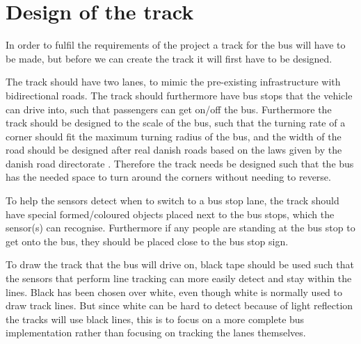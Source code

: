 \section{Design of the track} 

In order to fulfil the requirements of the project a track for the bus will have to be made, but before we can create the track it will first have to be designed.

The track should have two lanes, to mimic the pre-existing infrastructure with bidirectional roads. The track should furthermore have bus stops that the vehicle can drive into, such that passengers can get on/off the bus.
Furthermore the track should be designed to the scale of the bus, such that the turning rate of a corner should fit the maximum turning radius of the bus, and the width of the road should be designed after real danish roads based on the laws given by the danish road directorate \cite{roadRules}\cite{DriveingCurves}. Therefore the track needs be designed such that the bus has the needed space to turn around the corners without needing to reverse.

To help the sensors detect when to switch to a bus stop lane, the track should have special formed/coloured objects placed next to the bus stops, which the sensor(s) can recognise. Furthermore if any people are standing at the bus stop to get onto the bus, they should be placed close to the bus stop sign.

To draw the track that the bus will drive on, black tape should be used such that the sensors that perform line tracking can more easily detect and stay within the lines. Black has been chosen over white, even though white is normally used to draw track lines. But since white can be hard to detect because of light reflection the tracks will use black lines, this is to focus on a more complete bus implementation rather than focusing on tracking the lanes themselves.
